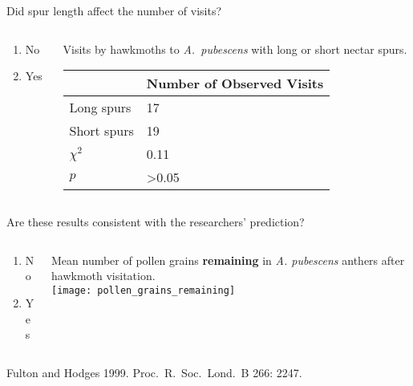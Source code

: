 \documentclass[t,hidelinks]{beamer}
\newcommand{\ques}[1]{\highlight{\textsc{q#1:}}}
\begin{document}
%
\begin{frame}[t]{\ques{12} Did spur length affect the number of visits?}
	
	\begin{columns}[t]
		\begin{column}{0.28\textwidth}
			\begin{enumerate}
				\item \alert<2>{No}
				\item Yes
			\end{enumerate}
		\end{column}
		\begin{column}{0.5\textwidth}
			Visits by hawkmoths to \textit{A.~pubescens} with long or short nectar spurs.
			
			\begin{tabular}{L{0.75in}R{1in}}
				\toprule
				& Number of Observed Visits \tabularnewline
				\midrule
				Long spurs		&	17	 \tabularnewline
				Short spurs		&	19	 \tabularnewline
				$\chi^2$		&	0.11 \tabularnewline
				$p$				&  \textgreater0.05 \tabularnewline
				\bottomrule
			\end{tabular}
		\end{column}
	\end{columns}
\end{frame}
%
\begin{frame}[t]{\ques{13} Are these results consistent with the researchers' prediction?}
		\begin{columns}[t]
		\begin{column}{0.28\textwidth}
			\begin{enumerate}
				\item No
				\item Yes
			\end{enumerate}
		\end{column}
		\begin{column}{0.5\textwidth}
			Mean number of pollen grains \textbf{remaining} in \textit{A. pubescens} anthers after hawkmoth visitation.\\[1ex]
			\texttt{[image: pollen\_grains\_remaining]}
		\end{column}
	\end{columns}
	
	\vfilll
	
	\tiny Fulton and Hodges 1999. Proc.~R.~Soc.~Lond.~B 266: 2247.
\end{frame}
%
\end{document}
